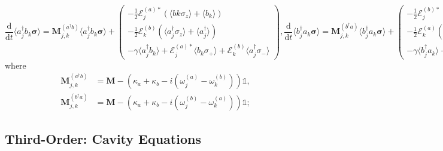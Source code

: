 \documentclass{article}
\newcommand{\ddt}[1][]{\frac{\mathrm{d} #1}{\mathrm{d}t}}
\begin{document}
\begin{subequations}
	\begin{equation}
		\ddt \langle a^{\dagger}_{j} b_{k} \bm{\sigma} \rangle = \bm{M}_{j, k}^{(a^{\dagger} b)} \langle a^{\dagger}_{j} b_{k} \bm{\sigma} \rangle + 
		\begin{pmatrix}
			-\frac{1}{2} \mathcal{E}_{j}^{(a) *} \left( \langle b{k} \sigma_{z} \rangle + \langle b_{k} \rangle \right) \\
			-\frac{1}{2} \mathcal{E}_{k}^{(b)} \left( \langle a^{\dagger}_{j} \sigma_{z} \rangle + \langle a^{\dagger}_{j} \rangle \right) \\
			-\gamma \langle a^{\dagger}_{j} b_{k} \rangle + \mathcal{E}_{j}^{(a) *} \langle b_{k} \sigma_{+} \rangle + \mathcal{E}_{k}^{(b)} \langle a^{\dagger}_{j} \sigma_{-} \rangle
		\end{pmatrix},
	\end{equation}
	\begin{equation}
		\ddt \langle b^{\dagger}_{j} a_{k} \bm{\sigma} \rangle = \bm{M}_{j, k}^{(b^{\dagger} a)} \langle b^{\dagger}_{j} a_{k} \bm{\sigma} \rangle + 
		\begin{pmatrix}
			-\frac{1}{2} \mathcal{E}_{j}^{(b) *} \left( \langle a_{k} \sigma_{z} \rangle + \langle a_{k} \rangle \right) \\
			-\frac{1}{2} \mathcal{E}_{k}^{(a)} \left( \langle b^{\dagger}_{j} \sigma_{z} \rangle + \langle b^{\dagger}_{j} \rangle \right) \\
			-\gamma \langle b^{\dagger}_{j} a_{k} \rangle + \mathcal{E}_{j}^{(b) *} \langle a_{k} \sigma_{+} \rangle + \mathcal{E}_{k}^{(a)} \langle b^{\dagger}_{j} \sigma_{-} \rangle
		\end{pmatrix},
	\end{equation}
\end{subequations}
where
\begin{subequations}
	\begin{align}
		\bm{M}_{j, k}^{(a^{\dagger} b)} &= \bm{M} - \left( \kappa_{a} + \kappa_{b} - i \left( \omega_{j}^{(a)} - \omega_{k}^{(b)} \right) \right) \mathbb{1}, \\
		\bm{M}_{j, k}^{(b^{\dagger} a)} &= \bm{M} - \left( \kappa_{a} + \kappa_{b} - i \left( \omega_{j}^{(b)} - \omega_{k}^{(a)} \right) \right) \mathbb{1};
	\end{align}
\end{subequations}

\subsection{Third-Order: Cavity Equations}
\end{document}
